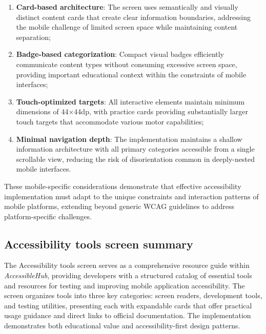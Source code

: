 \begin{enumerate}
    \item \textbf{Card-based architecture}: The screen uses semantically and visually distinct content cards that create clear information boundaries, addressing the mobile challenge of limited screen space while maintaining content separation;
    
    \item \textbf{Badge-based categorization}: Compact visual badges efficiently communicate content types without consuming excessive screen space, providing important educational context within the constraints of mobile interfaces;
    
    \item \textbf{Touch-optimized targets}: All interactive elements maintain minimum dimensions of 44×44dp, with practice cards providing substantially larger touch targets that accommodate various motor capabilities;
    
    \item \textbf{Minimal navigation depth}: The implementation maintains a shallow information architecture with all primary categories accessible from a single scrollable view, reducing the risk of disorientation common in deeply-nested mobile interfaces.
\end{enumerate}

These mobile-specific considerations demonstrate that effective accessibility implementation must adapt to the unique constraints and interaction patterns of mobile platforms, extending beyond generic WCAG guidelines to address platform-specific challenges.

\subsection{Accessibility tools screen summary}
\label{subsec:accessibility-tools-screen-summary}

The Accessibility tools screen serves as a comprehensive resource guide within \textit{AccessibleHub}, providing developers with a structured catalog of essential tools and resources for testing and improving mobile application accessibility. The screen organizes tools into three key categories: screen readers, development tools, and testing utilities, presenting each with expandable cards that offer practical usage guidance and direct links to official documentation. The implementation demonstrates both educational value and accessibility-first design patterns.

